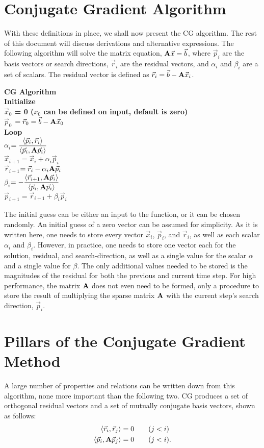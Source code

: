 \documentclass[11pt,letterpaper,oneside,notitlepage]{article}	%
\newcommand{\bfa}{{\bf A}}						%
\newcommand{\ip}[2]{\langle \vec #1,\vec #2 \rangle}	%
\newcommand{\aip}[2]{\langle \vec #1,\bfa\vec #2 \rangle}	%
\newcommand{\pindent}[1]{\hspace{6mm}}  		%
\numberwithin{equation}{section}				%
\begin{document}
\section{Conjugate Gradient Algorithm}%
\pindent{}With these definitions in place, we shall now present the CG algorithm. The rest of this document will discuss derivations and alternative expressions. The following algorithm will solve the matrix equation, $\bfa \vec x = \vec b$, where $\vec p_i$ are the basis vectors or search directions, $\vec r_i$ are the residual vectors, and $\alpha_i$ and $\beta_i$ are a set of scalars. The residual vector is defined as $\vec r_i = \vec b - \bfa\vec x_i$.
\begin{tabbing}
\bf CG \= \bf Alg\=\bf orit\=\bf hm \=\\
\>\bf Initialize\\
\>\>$\vec x_0$ \> = 0 \= ($x_0$ can be defined on input, default is zero)\\
\>\>$\vec p_0$ \>$= \vec r_0 =\vec b - \bfa \vec x_0$ \\
\> \bf Loop \\
\>\> $\alpha_i$\>$ = \dfrac{\ip{p_i}{r_i}}{\aip{p_i}{p_i}} $\\
\>\> $\vec x_{i+1}$\>$ = \vec x_i + \alpha_i \vec p_i$ \\
\>\> $\vec r_{i+1}$\>$ = \vec r_i - \alpha_i \bfa \vec p_i$ \\
\>\> $\beta_i$\>$ =-\dfrac{\aip{r_{i+1}}{p_i}}{\aip{p_i}{p_i}} $\\
\>\> $\vec p_{i+1}$\>$ = \vec r_{i+1} + \beta_i \vec p_i$
\end{tabbing}
The initial guess can be either an input to the function, or it can be chosen randomly. An initial guess of a zero vector can be assumed for simplicity. As it is written here, one needs to store every vector $\vec x_i$, $\vec p_i$, and $\vec r_i$, as well as each scalar $\alpha_i$ and $\beta_i$. However, in practice, one needs to store one vector each for the solution, residual, and search-direction, as well as a single value for the scalar $\alpha$ and a single value for $\beta$. The only additional values needed to be stored is the magnitudes of the residual for both the previous and current time step. For high performance, the matrix $\bfa$ does not even need to be formed, only a procedure to store the result of multiplying the sparse matrix $\bfa$ with the current step's search direction, $\vec p_i$.


\section{Pillars of the Conjugate Gradient Method}%
\pindent{}A large number of properties and relations can be written down from this algorithm, none more important than the following two. CG produces a set of orthogonal residual vectors and a set of mutually conjugate basis vectors\cite{Trefethen97}, shown as follows:
\begin{align}
\ip{r_i}{r_j} &= 0 &\quad(&j<i) \label{OrthRes}\\
\aip{p_i}{p_j} &= 0 &\quad(&j<i) \label{ConjP}
.\end{align}
\end{document}
